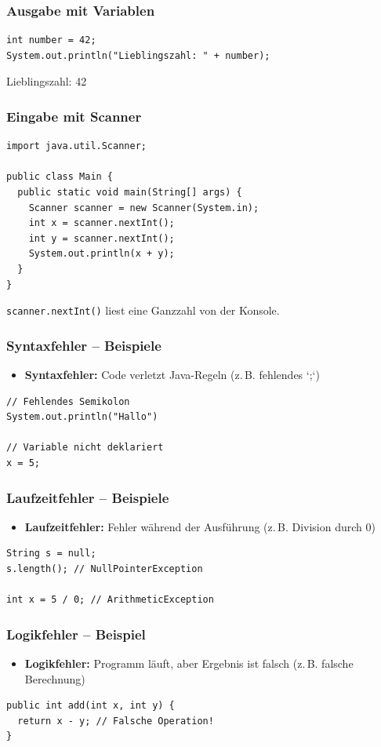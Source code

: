 \documentclass{../../presentation}
\begin{document}
\begin{frame}[fragile]
  \frametitle{Ausgabe mit Variablen}
  \begin{verbatim}
int number = 42;
System.out.println("Lieblingszahl: " + number);
  \end{verbatim}
  \begin{ausgabe}
    Lieblingszahl: 42
  \end{ausgabe}
\end{frame}

\begin{frame}[fragile]
  \frametitle{Eingabe mit Scanner}
  \begin{verbatim}
import java.util.Scanner;

public class Main {
  public static void main(String[] args) {
    Scanner scanner = new Scanner(System.in);
    int x = scanner.nextInt();
    int y = scanner.nextInt();
    System.out.println(x + y);
  }
}
  \end{verbatim}
  \achtung{} \texttt{scanner.nextInt()} liest eine Ganzzahl von der Konsole.
\end{frame}

\begin{frame}[fragile]
  \frametitle{Syntaxfehler – Beispiele}
  \begin{itemize}
    \item \textbf{Syntaxfehler:} Code verletzt Java-Regeln (z.\,B. fehlendes `;`)
  \end{itemize}
  \begin{verbatim}
// Fehlendes Semikolon
System.out.println("Hallo")

// Variable nicht deklariert
x = 5;
  \end{verbatim}
\end{frame}

\begin{frame}[fragile]
  \frametitle{Laufzeitfehler – Beispiele}
  \begin{itemize}
    \item \textbf{Laufzeitfehler:} Fehler während der Ausführung (z.\,B. Division durch 0)
  \end{itemize}
  \begin{verbatim}
String s = null;
s.length(); // NullPointerException

int x = 5 / 0; // ArithmeticException
  \end{verbatim}
\end{frame}

\begin{frame}[fragile]
  \frametitle{Logikfehler – Beispiel}
  \begin{itemize}
    \item \textbf{Logikfehler:} Programm läuft, aber Ergebnis ist falsch (z.\,B. falsche Berechnung)
  \end{itemize}
  \begin{verbatim}
public int add(int x, int y) {
  return x - y; // Falsche Operation!
}
  \end{verbatim}
\end{frame}
\end{document}
